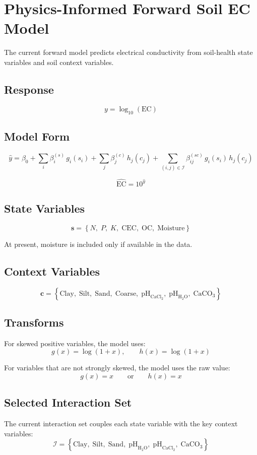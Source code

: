 \documentclass[11pt]{article}
\begin{document}
\section*{Physics-Informed Forward Soil EC Model}

The current forward model predicts electrical conductivity from soil-health
state variables and soil context variables.

\subsection*{Response}
\[
y = \log_{10}(\mathrm{EC})
\]

\subsection*{Model Form}
\[
\hat{y}
= \beta_0
+ \sum_i \beta_i^{(s)} \, g_i(s_i)
+ \sum_j \beta_j^{(c)} \, h_j(c_j)
+ \sum_{(i,j)\in\mathcal{I}} \beta_{ij}^{(sc)} \, g_i(s_i)\,h_j(c_j)
\]

\[
\widehat{\mathrm{EC}} = 10^{\hat{y}}
\]

\subsection*{State Variables}
\[
\mathbf{s} =
\left\{
N,\;P,\;K,\;\mathrm{CEC},\;\mathrm{OC},\;\mathrm{Moisture}
\right\}
\]

At present, moisture is included only if available in the data.

\subsection*{Context Variables}
\[
\mathbf{c} =
\left\{
\mathrm{Clay},\;\mathrm{Silt},\;\mathrm{Sand},\;\mathrm{Coarse},\;
\mathrm{pH}_{\mathrm{CaCl_2}},\;\mathrm{pH}_{\mathrm{H_2O}},\;\mathrm{CaCO_3}
\right\}
\]

\subsection*{Transforms}
For skewed positive variables, the model uses:
\[
g(x)=\log(1+x),
\qquad
h(x)=\log(1+x)
\]

For variables that are not strongly skewed, the model uses the raw value:
\[
g(x)=x
\qquad \text{or} \qquad h(x)=x
\]

\subsection*{Selected Interaction Set}
The current interaction set couples each state variable with the key context variables:
\[
\mathcal{I} =
\left\{
\mathrm{Clay},\;\mathrm{Silt},\;\mathrm{Sand},\;
\mathrm{pH}_{\mathrm{H_2O}},\;\mathrm{pH}_{\mathrm{CaCl_2}},\;\mathrm{CaCO_3}
\right\}
\]
\end{document}
